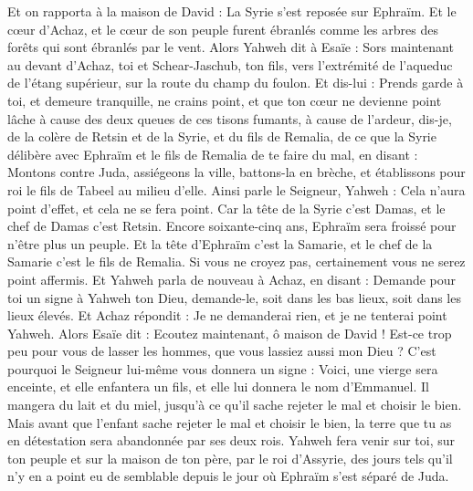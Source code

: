 \begin{multicols}{2}
Et on rapporta à la maison de David : La Syrie s'est reposée sur Ephraïm. Et le cœur d'Achaz, et le cœur de son peuple furent ébranlés comme les arbres des forêts qui sont ébranlés par le vent.
Alors Yahweh dit à Esaïe : Sors maintenant au devant d'Achaz, toi et Schear-Jaschub, ton fils, vers l'extrémité de l'aqueduc de l'étang supérieur, sur la route du champ du foulon.
Et dis-lui : Prends garde à toi, et demeure tranquille, ne crains point, et que ton cœur ne devienne point lâche à cause des deux queues de ces tisons fumants, à cause de l'ardeur, dis-je, de la colère de Retsin et de la Syrie, et du fils de Remalia,
de ce que la Syrie délibère avec Ephraïm et le fils de Remalia de te faire du mal, en disant :
Montons contre Juda, assiégeons la ville, battons-la en brèche, et établissons pour roi le fils de Tabeel au milieu d'elle.
Ainsi parle le Seigneur, Yahweh : Cela n'aura point d'effet, et cela ne se fera point.
Car la tête de la Syrie c'est Damas, et le chef de Damas c'est Retsin. Encore soixante-cinq ans, Ephraïm sera froissé pour n'être plus un peuple.
Et la tête d'Ephraïm c'est la Samarie, et le chef de la Samarie c'est le fils de Remalia. Si vous ne croyez pas, certainement vous ne serez point affermis.
Et Yahweh parla de nouveau à Achaz, en disant :
Demande pour toi un signe à Yahweh ton Dieu, demande-le, soit dans les bas lieux, soit dans les lieux élevés.
Et Achaz répondit : Je ne demanderai rien, et je ne tenterai point Yahweh.
Alors Esaïe dit : Ecoutez maintenant, ô maison de David ! Est-ce trop peu pour vous de lasser les hommes, que vous lassiez aussi mon Dieu ?
C'est pourquoi le Seigneur lui-même vous donnera un signe : Voici, une vierge sera enceinte, et elle enfantera un fils, et elle lui donnera le nom d'Emmanuel.
Il mangera du lait et du miel, jusqu'à ce qu'il sache rejeter le mal et choisir le bien.
Mais avant que l'enfant sache rejeter le mal et choisir le bien, la terre que tu as en détestation sera abandonnée par ses deux rois.
Yahweh fera venir sur toi, sur ton peuple et sur la maison de ton père, par le roi d'Assyrie, des jours tels qu'il n'y en a point eu de semblable depuis le jour où Ephraïm s'est séparé de Juda.

\end{multicols}
